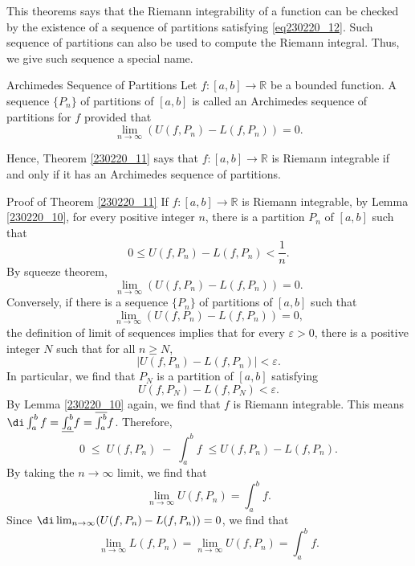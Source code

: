 This theorems says that the Riemann integrability of a function can be checked by the existence of a sequence of partitions satisfying \eqref{eq230220_12}. Such sequence of partitions can also be used to compute the   Riemann integral. Thus, we give such sequence a special name.
\begin{definition}{Archimedes Sequence of Partitions}
Let $f:[a,b]\to\mathbb{R}$ be a bounded function. A sequence $\{P_n\}$ of partitions of $[a,b]$ is called an Archimedes sequence of partitions for $f$ provided that
\[\lim_{n\to \infty}(U(f,P_n)-L(f,P_n))=0.\]
\end{definition}Hence, Theorem \ref{230220_11} says that $f:[a,b]\to\mathbb{R}$ is Riemann integrable if and only if it has an Archimedes sequence of partitions. 

\begin{myproof}{\linkt Proof of Theorem \ref{230220_11}}
If $f:[a,b]\to\mathbb{R}$ is Riemann integrable,  by Lemma \ref{230220_10}, for every positive integer $n$, there is a partition $P_n$ of $[a,b]$ such that
\[0\leq U(f,P_n)-L(f,P_n)<\frac{1}{n}.\]
 By squeeze theorem,
\[\lim_{n\to\infty}(U(f,P_n)-L(f,P_n))=0.\] Conversely, if there is a sequence $\{P_n\}$ of partitions of $[a,b]$ such that
\[\lim_{n\to \infty}(U(f,P_n)-L(f,P_n))=0,\]  the definition of limit of sequences implies that for every $\varepsilon>0$, there is a positive integer $N$ such that for all $n\geq N$,
\[|U(f,P_n)-L(f,P_n)|<\varepsilon.\]In particular, we find that $P_N$ is a partition of $[a,b]$ satisfying
\[U(f,P_N)-L(f,P_N)<\varepsilon.\]
By Lemma \ref{230220_10} again, we find that $f$ is Riemann integrable.
This means $\di\int_a^bf=\underline{\int_a^b}f =\overline{\int_a^b} f$. Therefore,
\[0\;\leq\; U(f,P_n)\;-\;\int_a^b f\;\leq U(f,P_n)-L(f,P_n).\]
By taking the $n\to \infty$ limit, we find that
\[\lim_{n\to \infty}U(f,P_n)=\int_a^bf.\]Since $\di \lim_{n\to \infty}(U(f,P_n)-L(f,P_n))=0$, we find that
  \[\lim_{n\to \infty}L(f,P_n)=\lim_{n\to \infty}U(f,P_n)=\int_a^bf.\]  
\end{myproof}

